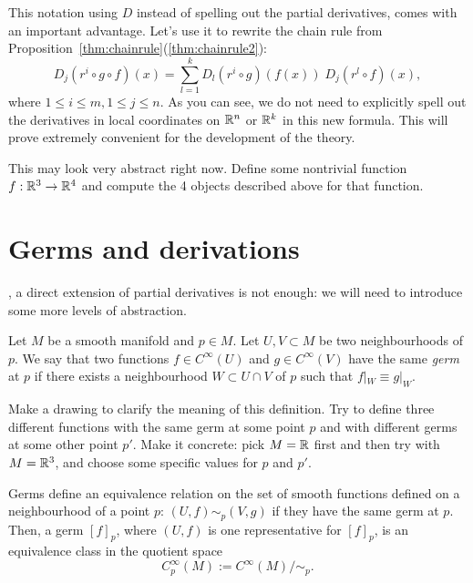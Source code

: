 This notation using $D$ instead of spelling out the partial derivatives, comes with an important advantage.
Let's use it to rewrite the chain rule from Proposition~\ref{thm:chainrule}(\ref{thm:chainrule2}):
\begin{equation}
  D_j(r^i\circ g \circ f) (x) = \sum_{l=1}^k D_l(r^i\circ g)(f(x))\; D_j(r^l \circ f)(x),
\end{equation}
where $1\leq i\leq m, 1\leq j \leq n$.
As you can see, we do not need to explicitly spell out the derivatives in local coordinates on $\mathbb{R}^n$ or $\mathbb{R}^k$ in this new formula.
This will prove extremely convenient for the development of the theory.

\begin{exercise}
  This may look very abstract right now.
  Define some nontrivial function $f: \mathbb{R}^3 \to \mathbb{R}^4$ and compute the 4 objects described above for that function.
\end{exercise}

\section{Germs and derivations}

, a direct extension of partial derivatives is not enough: we will need to introduce some more levels of abstraction.

\begin{definition}
  Let $M$ be a smooth manifold and $p\in M$.
  Let $U,V\subset M$ be two neighbourhoods of $p$.
  We say that two functions $f\in C^\infty(U)$ and $g\in C^\infty(V)$ have the same \emph{germ} at $p$ if there exists a neighbourhood $W\subset U\cap V$ of $p$ such that $f|_W \equiv g|_W$.
\end{definition}

\begin{exercise}
  Make a drawing to clarify the meaning of this definition.
  Try to define three different functions with the same germ at some point $p$ and with different germs at some other point $p'$.
  Make it concrete: pick $M=\mathbb{R}$ first and then try with $M=\mathbb{R}^3$, and choose some specific values for $p$ and $p'$.
\end{exercise}

Germs define an equivalence relation on the set of smooth functions defined on a neighbourhood of a point $p$: $(U, f) \sim_p (V, g)$ if they have the same germ at $p$. Then, a germ $[f]_p$, where $(U, f)$ is one representative for $[f]_p$, is an equivalence class in the quotient space
\begin{equation}
  C_p^\infty(M) := C^\infty(M)/\!\sim_p.
\end{equation}

